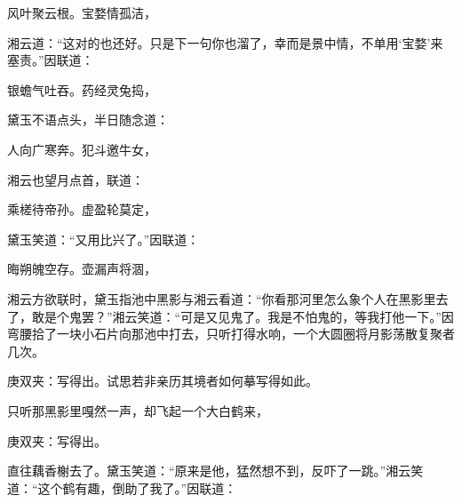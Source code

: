 \begin{poem}
    \begin{pl}风叶聚云根。宝婺情孤洁，\end{pl}
\end{poem}


\begin{parag}
    湘云道：“这对的也还好。只是下一句你也溜了，幸而是景中情，不单用‘宝婺’来塞责。”因联道：
\end{parag}


\begin{poem}
    \begin{pl}银蟾气吐吞。药经灵兔捣，\end{pl}
\end{poem}


\begin{parag}
    黛玉不语点头，半日随念道：
\end{parag}


\begin{poem}
    \begin{pl}人向广寒奔。犯斗邀牛女，\end{pl}
\end{poem}


\begin{parag}
    湘云也望月点首，联道：
\end{parag}


\begin{poem}
    \begin{pl}乘槎待帝孙。虚盈轮莫定，\end{pl}
\end{poem}


\begin{parag}
    黛玉笑道：“又用比兴了。”因联道：
\end{parag}


\begin{poem}
    \begin{pl}晦朔魄空存。壶漏声将涸，\end{pl}
\end{poem}


\begin{parag}
    湘云方欲联时，黛玉指池中黑影与湘云看道：“你看那河里怎么象个人在黑影里去了，敢是个鬼罢？”湘云笑道：“可是又见鬼了。我是不怕鬼的，等我打他一下。”因弯腰拾了一块小石片向那池中打去，只听打得水响，一个大圆圈将月影荡散复聚者几次。\begin{note}庚双夹：写得出。试思若非亲历其境者如何摹写得如此。\end{note}只听那黑影里嘎然一声，却飞起一个大白鹤来，\begin{note}庚双夹：写得出。\end{note}直往藕香榭去了。黛玉笑道：“原来是他，猛然想不到，反吓了一跳。”湘云笑道：“这个鹤有趣，倒助了我了。”因联道：
\end{parag}



